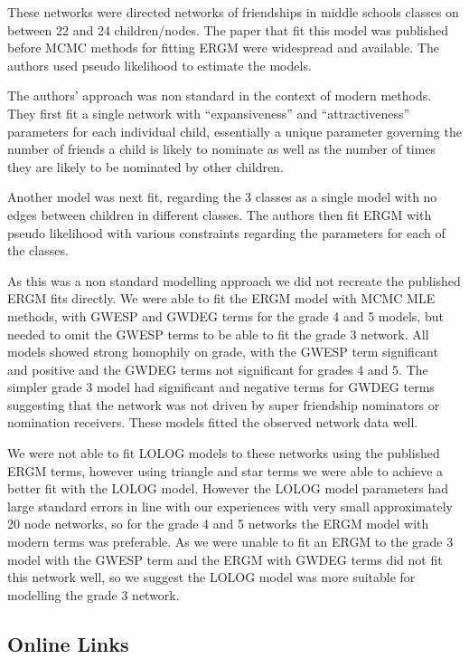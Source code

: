 \documentclass[
]{statsoc}
\begin{document}
These networks were directed networks of friendships in middle schools
classes on between 22 and 24 children/nodes. The paper that fit this
model was published before MCMC methods for fitting ERGM were widespread
and available. The authors used pseudo likelihood to estimate the
models.

The authors' approach was non standard in the context of modern methods.
They first fit a single network with ``expansiveness'' and
``attractiveness'' parameters for each individual child, essentially a
unique parameter governing the number of friends a child is likely to
nominate as well as the number of times they are likely to be nominated
by other children.

Another model was next fit, regarding the 3 classes as a single model
with no edges between children in different classes. The authors then
fit ERGM with pseudo likelihood with various constraints regarding the
parameters for each of the classes.

As this was a non standard modelling approach we did not recreate the
published ERGM fits directly. We were able to fit the ERGM model with
MCMC MLE methods, with GWESP and GWDEG terms for the grade 4 and 5
models, but needed to omit the GWESP terms to be able to fit the grade 3
network. All models showed strong homophily on grade, with the GWESP
term significant and positive and the GWDEG terms not significant for
grades 4 and 5. The simpler grade 3 model had significant and negative
terms for GWDEG terms suggesting that the network was not driven by
super friendship nominators or nomination receivers. These models fitted
the observed network data well.

We were not able to fit LOLOG models to these networks using the
published ERGM terms, however using triangle and star terms we were able
to achieve a better fit with the LOLOG model. However the LOLOG model
parameters had large standard errors in line with our experiences with
very small approximately 20 node networks, so for the grade 4 and 5
networks the ERGM model with modern terms was preferable. As we were
unable to fit an ERGM to the grade 3 model with the GWESP term and the
ERGM with GWDEG terms did not fit this network well, so we suggest the
LOLOG model was more suitable for modelling the grade 3 network.

\subsection{Online Links}
\end{document}
